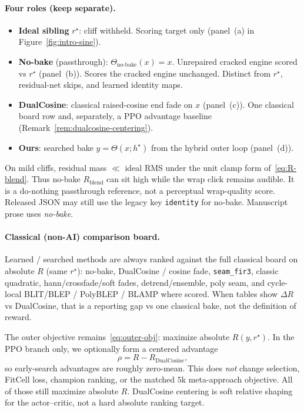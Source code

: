 \paragraph{Four roles (keep separate).}
\label{sec:four-roles}
\begin{itemize}
  \item \textbf{Ideal sibling} $r^{\star}$: cliff withheld. Scoring target only (panel~(a) in Figure~\ref{fig:intro-sine}).
  \item \textbf{No-bake} (passthrough): $\Theta_{\mathrm{no\text{-}bake}}(x)=x$. Unrepaired cracked engine scored vs $r^{\star}$ (panel~(b)). Scores the cracked engine unchanged. Distinct from $r^{\star}$, residual-net skips, and learned identity maps.
  \item \textbf{DualCosine}: classical raised-cosine end fade on $x$ (panel~(c)). One classical board row and, separately, a PPO advantage baseline (Remark~\ref{rem:dualcosine-centering}).
  \item \textbf{Ours}: searched bake $y=\Theta(x;h^{\star})$ from the hybrid outer loop (panel~(d)).
\end{itemize}
On mild cliffs, residual mass $\ll$ ideal RMS under the unit clamp form of~\eqref{eq:R-blend}.
Thus no-bake $R_{\mathrm{blend}}$ can sit high while the wrap click remains audible.
It is a do-nothing passthrough reference, not a perceptual wrap-quality score.
Released JSON may still use the legacy key \texttt{identity} for no-bake. Manuscript prose uses \emph{no-bake}.

\paragraph{Classical (non-AI) comparison board.}
\label{sec:classical-board}
Learned / searched methods are always ranked against the full classical board on absolute $R$ (same $r^{\star}$):
no-bake, DualCosine / cosine fade, \texttt{seam\_fir3}, classic quadratic, hann/crossfade/soft fades, detrend/ensemble, poly seam, and cycle-local BLIT/BLEP / PolyBLEP / BLAMP where scored.
When tables show $\Delta R$ vs DualCosine, that is a reporting gap vs one classical bake, not the definition of reward.

\begin{remark}
\label{rem:dualcosine-centering}
The outer objective remains~\eqref{eq:outer-obj}: maximize absolute $R(y,r^{\star})$.
In the PPO branch only, we optionally form a centered advantage
\begin{equation}
\label{eq:dualcosine-centering}
\rho = R - R_{\mathrm{DualCosine}},
\end{equation}
so early-search advantages are roughly zero-mean.
This does \emph{not} change selection, FitCell loss, champion ranking, or the matched $5$k meta-approach objective.
All of those still maximize absolute $R$.
DualCosine centering is soft relative shaping for the actor--critic, not a hard absolute ranking target.
\end{remark}

